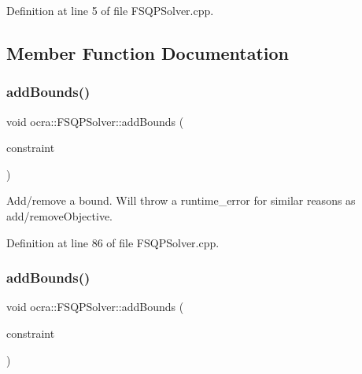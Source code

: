 Definition at line 5 of file F\+S\+Q\+P\+Solver.\+cpp.



\subsection{Member Function Documentation}
\hypertarget{classocra_1_1FSQPSolver_abad7c2c61aab4511990533b4ae9a32ad}{}\label{classocra_1_1FSQPSolver_abad7c2c61aab4511990533b4ae9a32ad} 
\subsubsection{\texorpdfstring{add\+Bounds()}{addBounds()}\hspace{0.1cm}{\footnotesize\ttfamily [1/2]}}
{\footnotesize\ttfamily void ocra\+::\+F\+S\+Q\+P\+Solver\+::add\+Bounds (\begin{DoxyParamCaption}\item[{\hyperlink{namespaceocra_a6e55fff77635080219964abc301abf18}{Bound\+Constraint} \&}]{constraint }\end{DoxyParamCaption})}

Add/remove a bound. Will throw a runtime\+\_\+error for similar reasons as add/remove\+Objective. 

Definition at line 86 of file F\+S\+Q\+P\+Solver.\+cpp.

\hypertarget{classocra_1_1FSQPSolver_ae51e651fc7b6bfb3b805c5d51279bc47}{}\label{classocra_1_1FSQPSolver_ae51e651fc7b6bfb3b805c5d51279bc47} 
\subsubsection{\texorpdfstring{add\+Bounds()}{addBounds()}\hspace{0.1cm}{\footnotesize\ttfamily [2/2]}}
{\footnotesize\ttfamily void ocra\+::\+F\+S\+Q\+P\+Solver\+::add\+Bounds (\begin{DoxyParamCaption}\item[{\hyperlink{namespaceocra_a5fc023ff4ef8f4b0cdf410e088090731}{Identity\+Constraint} \&}]{constraint }\end{DoxyParamCaption})}



